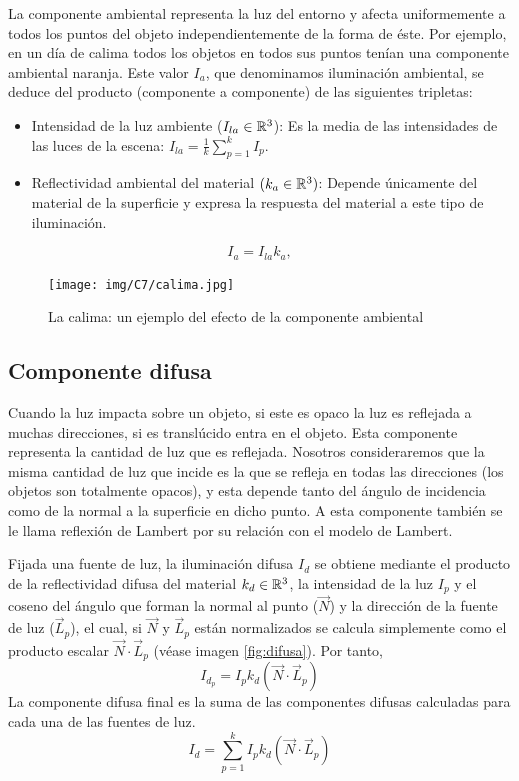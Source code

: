 La componente ambiental representa la luz del entorno y afecta uniformemente a todos los puntos del objeto independientemente de la forma de éste. Por ejemplo, en un día de calima todos los objetos en todos sus puntos tenían una componente ambiental naranja. Este valor $I_a$, que denominamos iluminación ambiental, se deduce del producto (componente a componente) de las siguientes tripletas:
\begin{itemize}
    \item Intensidad de la luz ambiente ($I_{la}\in\mathbb{R}^3$): Es la media de las intensidades de las luces de la escena: $I_{la}=\frac{1}{k}\sum_{p=1}^k I_p$.
    \item Reflectividad ambiental del material $(k_a\in\mathbb{R}^3)$: Depende únicamente del material de la superficie y expresa la respuesta del material a este tipo de iluminación. 
\end{itemize}
\begin{equation}
    I_a = I_{la} k_a,
\end{equation}

\begin{figure} [ht]
    \centering
    \texttt{[image: img/C7/calima.jpg]}
    \caption{La calima: un ejemplo del efecto de la componente ambiental}
    \label{fig:calima}
\end{figure}

\subsection{Componente difusa}

Cuando la luz impacta sobre un objeto, si este es opaco la luz es reflejada a muchas direcciones, si es translúcido entra en el objeto. Esta componente representa la cantidad de luz que es reflejada. Nosotros consideraremos que la misma cantidad de luz que incide es la que se refleja en todas las direcciones (los objetos son totalmente opacos), y esta depende tanto del ángulo de incidencia como de la normal a la superficie en dicho punto. A esta componente también se le llama reflexión de Lambert por su relación con el modelo de Lambert.

Fijada una fuente de luz, la iluminación difusa $I_d$ se obtiene mediante el producto de la reflectividad difusa del material $k_d\in\mathbb{R}^3$, la intensidad de la luz $I_p$ y el coseno del ángulo que forman la normal al punto ($\vec N$) y la dirección de la fuente de luz ($\vec L_p$), el cual, si $\vec N$ y $\vec L_p$ están normalizados se calcula simplemente como el producto escalar $\vec N\cdot \vec L_p$ (véase imagen \ref{fig:difusa}). Por tanto,
\begin{equation}
    I_{d_p} = I_p k_d (\vec N\cdot \vec L_p)
\end{equation}
La componente difusa final es la suma de las componentes difusas calculadas para cada una de las fuentes de luz.
\begin{equation}
    I_d = \sum_{p=1}^k I_p k_d (\vec N\cdot \vec L_p)
\end{equation}

